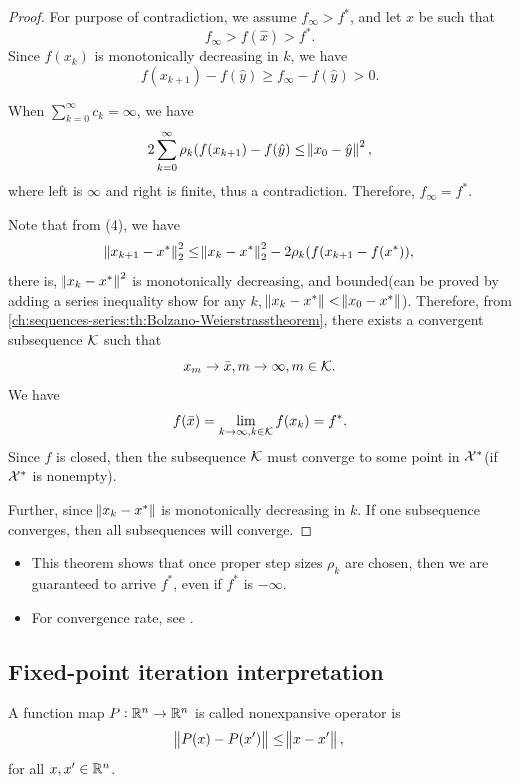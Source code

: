 \begin{refsection}
\begin{proof}
For purpose of contradiction, we assume $f_\infty > f^*$, and let $\hat{x}$ be such that
$$f_\infty > f(\hat{x}) > f^*.$$
Since $f(x_k)$ is monotonically decreasing in $k$, we have
$$f(x_{k+1}) - f(\hat{y}) \geq f_{\infty} - f(\hat{y}) > 0.$$

When $\sum_{k=0}^\infty c_k = \infty$, we have
$$2\sum_{k=0}^\infty \rho_k (f(x_{k+1}) - f(\hat{y}) \leq \norm{x_0 - \hat{y}}^2, $$
where left is $\infty$ and right is finite, thus a contradiction. Therefore, $f_\infty = f^*$.

Note that from (4), we have
$$
\norm{x_{k+1}-x^*}_2^2 
 \leq \norm{x_{k}-x^*}_2^2 -2\rho_k(f(x_{k+1}-f(x^*)),$$
there is, $\norm{x_k - x^*}^2$ is monotonically decreasing, and bounded(can be proved by adding a series inequality show for any $k$, $\norm{x_k - x^*} < \norm{x_0 - x^*}$). Therefore, from \autoref{ch:sequences-series:th:Bolzano-Weierstrasstheorem}, there exists a convergent subsequence $\mathcal{K}$ such that 
$$x_m \to \bar{x}, m\to \infty, m\in \mathcal{K}.$$
We have
$$f(\bar{x}) = \lim_{k\to \infty, k\in \mathcal{K}} f(x_k) = f^*.$$ 
Since $f$ is closed, then the subsequence $\mathcal{K}$ must converge to some point in $\mathcal{X}^*$(if $\mathcal{X}^*$ is nonempty).

Further, since  $\norm{x_k - x^*}$ is monotonically decreasing in $k$. If one subsequence converges, then all subsequences will converge.

\end{proof}


\begin{remark}\hfill
\begin{itemize}
	\item This theorem shows that once proper step sizes $\rho_k$ are chosen, then we are guaranteed to arrive $f^*$, even if $f^*$ is $-\infty$. 
	\item For convergence rate, see \cite[236]{bertsekas2015convex}.
\end{itemize}
	

\end{remark}


\subsection{Fixed-point iteration interpretation}
\begin{definition}
A function map $P:\mathbb{R}^n\to \mathbb{R}^n$ is called nonexpansive operator is
$$\norm{P(x) - P(x')} \leq \norm{x-x'},$$
for all $x,x'\in\mathbb{R}^n$. 
\end{definition}



\end{refsection}
